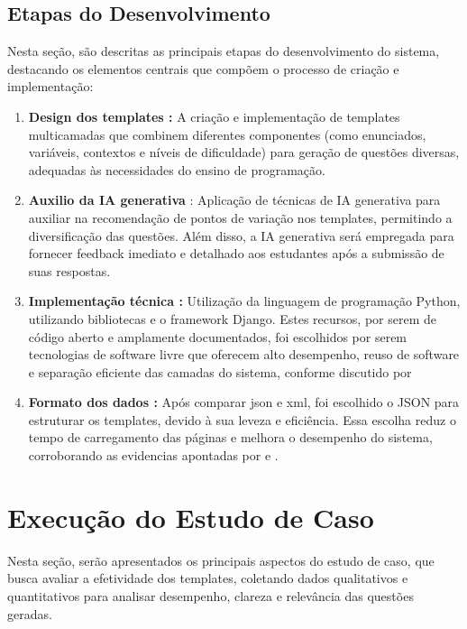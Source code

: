 \subsection{Etapas do Desenvolvimento}
Nesta seção, são descritas as principais etapas do desenvolvimento do sistema, destacando os elementos centrais que compõem o processo de criação e implementação: 

\begin{enumerate}[label=\textbf{\alph*)}]
    \item \textbf{Design dos templates :}  A criação e implementação de templates multicamadas que combinem diferentes componentes (como enunciados, variáveis, contextos e níveis de dificuldade) para geração de questões diversas, adequadas às necessidades do ensino de programação.
    \item \textbf{Auxilio da IA generativa} : Aplicação de técnicas de IA generativa para auxiliar na recomendação de pontos de variação nos templates, permitindo a diversificação das questões. Além disso, a IA generativa será empregada para fornecer feedback imediato e detalhado aos estudantes após a submissão de suas respostas.
    \item \textbf{Implementação técnica :}  Utilização da linguagem de programação Python, utilizando bibliotecas e o framework Django. Estes recursos, por serem de código aberto e amplamente documentados, foi escolhidos por serem tecnologias de software livre que oferecem alto desempenho, reuso de software e separação eficiente das camadas do sistema, conforme discutido por  \parencite{rubio2017}
    \item \textbf{Formato dos dados :}  Após comparar \gls{json} e \gls{xml}, foi escolhido o JSON para estruturar os templates, devido à sua leveza e eficiência. Essa escolha reduz o tempo de carregamento das páginas e melhora o desempenho do sistema, corroborando as evidencias apontadas por  \parencite{goyal2017} e \parencite{wang2011} .
\end{enumerate}

\section{Execução do Estudo de Caso}

Nesta seção, serão apresentados os principais aspectos do estudo de caso, que busca avaliar a efetividade dos templates, coletando dados qualitativos e quantitativos para analisar desempenho, clareza e relevância das questões geradas. 

